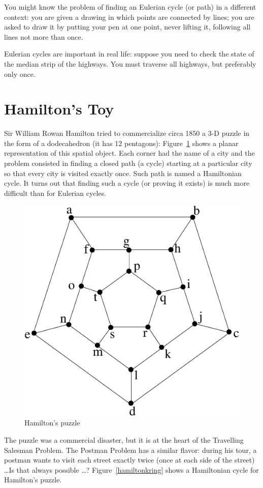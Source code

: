 You might know the problem of finding an Eulerian cycle (or path) in a
different context: you are given a drawing in which points are
connected by lines; you are asked to draw it by putting your pen at
one point, never lifting it, following all lines not more than once.

Eulerian cycles are important in real life: suppose you need to
check the state of the median strip of the highways. You must
traverse all highways, but preferably only once.

\section{Hamilton's Toy}

Sir William Rowan Hamilton tried to commercialize circa 1850 a 3-D
puzzle in the form of a dodecahedron (it has 12 pentagons):
Figure~\ref{hamilton1} shows a planar representation of this spatial
object. Each corner had the name of a city and the problem consisted
in finding a closed path (a cycle) starting at a particular city so
that every city is visited exactly once. Such path is named a
Hamiltonian cycle. It turns out that finding such a cycle (or proving
it exists) is much more difficult than for Eulerian cycles.

\begin{figure}[ht]
	\centering
	\includegraphics[width=0.4\linewidth,keepaspectratio]{hamilton}
	\caption{Hamilton's puzzle
	\label{hamilton1}}
\end{figure}

The puzzle was a commercial disaster, but it is at the heart of the
Travelling Salesman Problem.
The Postman Problem has a similar flavor: during his tour, a postman
wants to visit each street exactly twice (once at each side of the
street) \ldots Is that always possible \ldots? Figure~\ref{hamiltonkring} shows a Hamiltonian cycle for Hamilton's puzzle.

